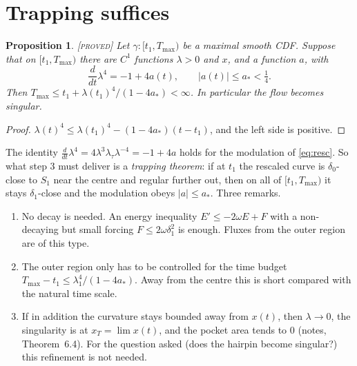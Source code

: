 \documentclass[11pt]{amsart}
\newtheorem{proposition}[theorem]{Proposition}
\theoremstyle{remark}
\newcommand{\lab}[1]{\textup{\textsc{[#1]}}}
\begin{document}
\section{Trapping suffices}

\begin{proposition}\label{prop:trap}\lab{proved}
Let $\gamma:[t_1,T_{\max})$ be a maximal smooth CDF. Suppose that on $[t_1,T_{\max})$ there are $C^1$ functions $\lambda>0$ and $x$, and a function $a$, with
\[
\frac{d}{dt}\lambda^4=-1+4a(t),\qquad |a(t)|\le a_*<\tfrac14 .
\]
Then $T_{\max}\le t_1+\lambda(t_1)^4/(1-4a_*)<\infty$. In particular the flow becomes singular.
\end{proposition}
\begin{proof}
$\lambda(t)^4\le\lambda(t_1)^4-(1-4a_*)(t-t_1)$, and the left side is positive.
\end{proof}

The identity $\frac{d}{dt}\lambda^4=4\lambda^3\lambda_\tau\lambda^{-4}=-1+4a$ holds for the modulation of \eqref{eq:resc}. So what step 3 must deliver is a \emph{trapping theorem}: if at $t_1$ the rescaled curve is $\delta_0$-close to $S_1$ near the centre and regular further out, then on all of $[t_1,T_{\max})$ it stays $\delta_1$-close and the modulation obeys $|a|\le a_*$. Three remarks.
\begin{enumerate}
\item No decay is needed. An energy inequality $E'\le-2\omega E+F$ with a non-decaying but small forcing $F\le2\omega\delta_1^2$ is enough. Fluxes from the outer region are of this type.
\item The outer region only has to be controlled for the time budget $T_{\max}-t_1\le\lambda_1^4/(1-4a_*)$. Away from the centre this is short compared with the natural time scale.
\item If in addition the curvature stays bounded away from $x(t)$, then $\lambda\to0$, the singularity is at $x_T=\lim x(t)$, and the pocket area tends to $0$ (notes, Theorem~6.4). For the question asked (does the hairpin become singular?) this refinement is not needed.
\end{enumerate}
\end{document}
